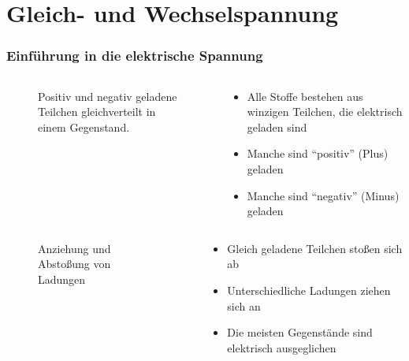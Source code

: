 
\section{Gleich- und  Wechselspannung}
\label{section:gleich_und_wechselspannung}
\begin{frame}%

\frametitle{Einführung in die elektrische Spannung}
\begin{columns}
    \begin{column}{0.60\textwidth}
    
\begin{figure}
    \caption{\scriptsize Positiv und negativ geladene Teilchen gleichverteilt in einem Gegenstand.}
    \label{n_frequenz_elektrische_ladungen}
\end{figure}


    \end{column}
   \begin{column}{0.38\textwidth}
       \begin{itemize}
  \item Alle Stoffe bestehen aus winzigen Teilchen, die elektrisch geladen sind
  \item Manche sind \enquote{positiv} (Plus) geladen
  \item Manche sind \enquote{negativ} (Minus) geladen
  \end{itemize}

   \end{column}
\end{columns}

\end{frame}

\begin{frame}
\begin{columns}
    \begin{column}{0.48\textwidth}
    
\begin{figure}
    \caption{\scriptsize Anziehung und Abstoßung von Ladungen}
    \label{n_ladungen}
\end{figure}


    \end{column}
   \begin{column}{0.48\textwidth}
       \begin{itemize}
  \item Gleich geladene Teilchen stoßen sich ab
  \item Unterschiedliche Ladungen ziehen sich an
  \item Die meisten Gegenstände sind elektrisch ausgeglichen
  \end{itemize}

   \end{column}
\end{columns}

\end{frame}

